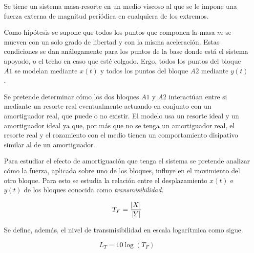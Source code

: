 Se tiene un sistema masa-resorte en un medio viscoso al que se le impone una fuerza externa de magnitud periódica en cualquiera de los extremos.

\begin{center}
    \def\svgwidth{0.8\linewidth}
    
\end{center}

Como hipótesis se supone que todos los puntos que componen la masa $m$ se mueven con un solo grado de libertad y con la misma aceleración.
Estas condiciones se dan análogamente para los puntos de la base donde está el sistema apoyado, o el techo en caso que esté colgado.
Ergo, todos los puntos del bloque $A1$ se modelan mediante $x(t)$ y todos los puntos del bloque $A2$ mediante $y(t)$.

Se pretende determinar cómo los dos bloques $A1$ y $A2$ interactúan entre si mediante un resorte real eventualmente actuando en conjunto con un amortiguador real, que puede o no existir.
El modelo usa un resorte ideal y un amortiguador ideal ya que, por más que no se tenga un amortiguador real, el resorte real y el rozamiento con el medio tienen un comportamiento disipativo similar al de un amortiguador.

Para estudiar el efecto de amortiguación que tenga el sistema se pretende analizar cómo la fuerza, aplicada sobre uno de los bloques, influye en el movimiento del otro bloque.
Para esto se estudia la relación entre el desplazamiento $x(t)$ e $y(t)$ de los bloques conocida como \emph{transmisibilidad}.

\begin{mdframed}[style=DefinitionFrame]
    \begin{defn}
    \end{defn}
    \begin{equation*}
        T_F = \frac{{\left| {X} \right|}}{{\left| {Y} \right|}}
    \end{equation*}
\end{mdframed}

Se define, además, el nivel de transmisibilidad en escala logarítmica como sigue.

\begin{mdframed}[style=DefinitionFrame]
    \begin{defn}
    \end{defn}
    \begin{equation*}
        L_T=10 \log \left( T_F \right)
    \end{equation*}
\end{mdframed}

